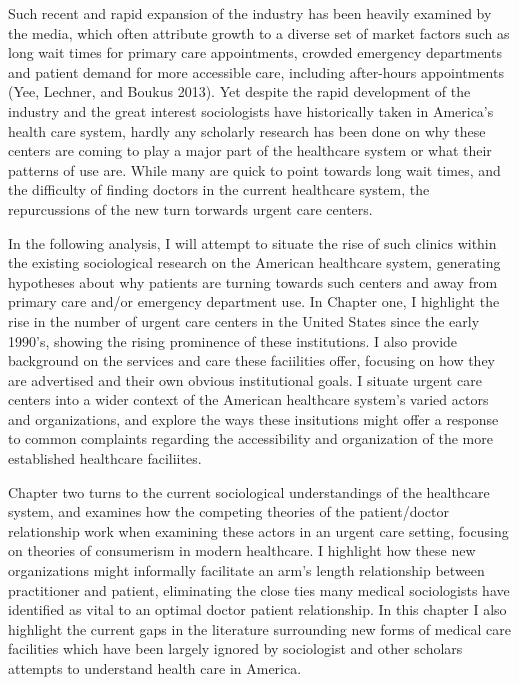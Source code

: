 \documentclass[12pt,twoside]{reedthesis}
\begin{document}
  Such recent and rapid expansion of the industry has been heavily
  examined by the media, which often attribute growth to a diverse set of
  market factors such as long wait times for primary care appointments,
  crowded emergency departments and patient demand for more accessible
  care, including after-hours appointments (Yee, Lechner, and Boukus
  2013). Yet despite the rapid development of the industry and the great
  interest sociologists have historically taken in America's health care
  system, hardly any scholarly research has been done on why these centers
  are coming to play a major part of the healthcare system or what their
  patterns of use are. While many are quick to point towards long wait
  times, and the difficulty of finding doctors in the current healthcare
  system, the repurcussions of the new turn torwards urgent care centers.
  
  In the following analysis, I will attempt to situate the rise of such
  clinics within the existing sociological research on the American
  healthcare system, generating hypotheses about why patients are turning
  towards such centers and away from primary care and/or emergency
  department use. In Chapter one, I highlight the rise in the number of
  urgent care centers in the United States since the early 1990's, showing
  the rising prominence of these institutions. I also provide background
  on the services and care these faciilities offer, focusing on how they
  are advertised and their own obvious institutional goals. I situate
  urgent care centers into a wider context of the American healthcare
  system's varied actors and organizations, and explore the ways these
  insitutions might offer a response to common complaints regarding the
  accessibility and organization of the more established healthcare
  faciliites.
  
  Chapter two turns to the current sociological understandings of the
  healthcare system, and examines how the competing theories of the
  patient/doctor relationship work when examining these actors in an
  urgent care setting, focusing on theories of consumerism in modern
  healthcare. I highlight how these new organizations might informally
  facilitate an arm's length relationship between practitioner and
  patient, eliminating the close ties many medical sociologists have
  identified as vital to an optimal doctor patient relationship. In this
  chapter I also highlight the current gaps in the literature surrounding
  new forms of medical care facilities which have been largely ignored by
  sociologist and other scholars attempts to understand health care in
  America.
  
\end{document}
